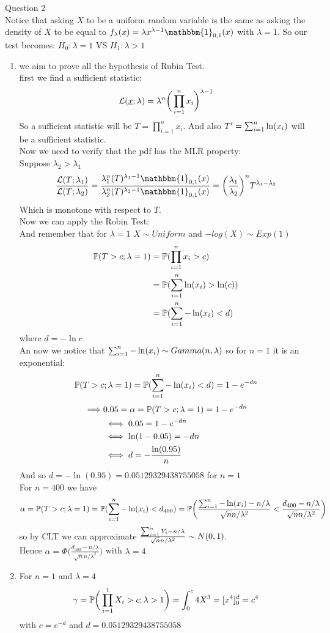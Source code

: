 Question 2\\
Notice that asking $X$ to be a uniform random variable is the same as asking the density of $X$ to be equal to $f_\lambda (x)=\lambda x^{\lambda -1} \mathbbm{1}_{0,1}(x)$  with $\lambda=1$. So our test becomes: $H_0 : \lambda =1 $ VS $H_1: \lambda > 1$
\begin{enumerate}
	\item we aim to prove all the hypothesis of Rubin Test.\\
	first we find a sufficient statistic:
	$$\mathcal{L}(\underline x;\lambda)=\lambda^n\bigg(\prod_{i=1}^{n} x_i\bigg)^{\lambda -1}$$
	So a sufficient statistic will be $T=\prod_{i=1}^{n} x_i$. And also $T'=\sum_{i=1}^n \ln(x_i)$ will be a sufficient statistic.\\
	Now we need to verify that the pdf has the MLR property:\\
	Suppose $\lambda_2 >\lambda_1$
	$$\frac{\mathcal{L}(T;\lambda_1)}{\mathcal{L}(T;\lambda_2)}=\frac{\lambda_1^n(T)^{\lambda_1 -1}\mathbbm{1}_{0,1}(x)}{\lambda_2^n(T)^{\lambda_2 -1}\mathbbm{1}_{0,1}(x)}=\bigg(\frac{\lambda_1}{\lambda_2}\bigg)^n T^{\lambda_1 -\lambda_2}$$
	Which is monotone with respect to $T$.\\
	Now we can apply the Robin Test:\\
	And remember that for $\lambda =1$ $X\sim Uniform$ and $-log(X) \sim Exp(1)$
	\[
	\begin{split}
	\mathbb{P}(T>c; \lambda =1)
	&=\mathbb{P}(\prod_{i=1}^{n} x_i >c)\\
	&=\mathbb{P}(\sum_{i=1}^n \ln (x_i)> \ln(c))\\
	&=\mathbb{P}(\sum_{i=1}^n -\ln (x_i) < d)
	\end{split}
	\]
	where $d=-\ln c$\\
	An now we notice that $\sum_{i=1}^n -\ln (x_i)\sim Gamma(n,\lambda)$ so for $n=1$ it is an exponential:
	$$	\mathbb{P}(T>c; \lambda =1)=\mathbb{P}(\sum_{i=1}^n -\ln (x_i) < d)=1-e^{-dn}$$
	\[
	\begin{split}
	\implies 
	&0.05=\alpha=\mathbb{P}(T>c; \lambda =1)=1-e^{-dn}\\
	&\iff 0.05=1-e^{-dn}\\
	&\iff \ln (1- 0.05 )=-dn\\
	&\iff d=-\frac{\ln (0.95 )}{n}
	\end{split}
	\]
	And so $d=-\ln (0.95 )=  0.05129329438755058$ for $n=1$\\
	
	
	
	For $n=400$ we have 
		$$	\alpha=\mathbb{P}(T>c; \lambda =1)=\mathbb{P}(\sum_{i=1}^n -\ln (x_i) < d_{400})= \mathbb{P} \bigg(  \frac{\sum_{i=1}^n -\ln (x_i) - n/\lambda}{\sqrt{n}n/\lambda^2} <  \frac{d_{400} - n/\lambda}{\sqrt{n}n/\lambda^2} \bigg)$$
		so by CLT we can approximate $ \frac{\sum_{i=1}^n Y_i - n/\lambda}{\sqrt{n}n/\lambda^2} \sim N(0,1)$.\\ Hence  $\alpha = \Phi\bigg( \frac{d_{400} - n/\lambda}{\sqrt{n}n/\lambda^2} \bigg)$ with $\lambda = 4$
	\item For $n=1$ and $\lambda =4$\\
	$$\gamma =\mathbb{P}\bigg(\prod_{i=1}^1 X_i > c ; \lambda >1\bigg)=\int_{0}^{c} 4 X^3 = [x^4]^d_0=c^4$$
	with $c=e^{-d}$ and  $d=0.05129329438755058$\\
	

\end{enumerate}
